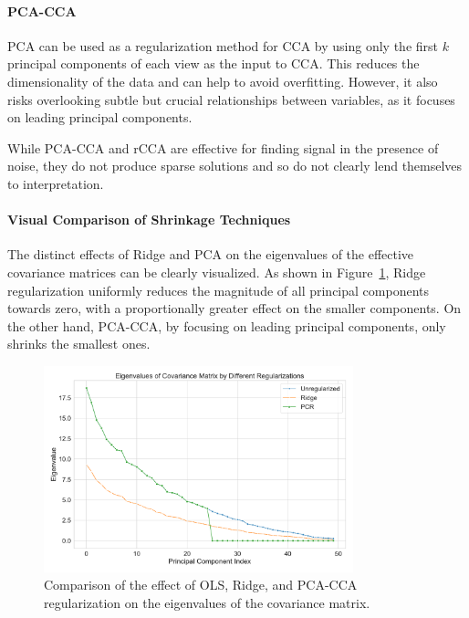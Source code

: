 \paragraph{PCA-CCA} PCA can be used as a regularization method for CCA by using only the first \( k \) principal components of each view as the input to CCA.
This reduces the dimensionality of the data and can help to avoid overfitting.
However, it also risks overlooking subtle but crucial relationships between variables, as it focuses on leading principal components.

While PCA-CCA and rCCA are effective for finding signal in the presence of noise, they do not produce sparse
solutions and so do not clearly lend themselves to interpretation.

\paragraph{Visual Comparison of Shrinkage Techniques}

The distinct effects of Ridge and PCA on the eigenvalues of the effective covariance matrices can be clearly visualized.
As shown in Figure~\ref{fig:shrinkage}, Ridge regularization uniformly reduces the magnitude of all principal components towards zero, with a proportionally greater effect on the smaller components.
On the other hand, PCA-CCA, by focusing on leading principal components, only shrinks the smallest ones.

\begin{figure}
    \centering
    \includegraphics[width=0.8\textwidth]{figures/shrinkage/shrinkage}
    \caption{Comparison of the effect of OLS, Ridge, and PCA-CCA regularization on the eigenvalues of the covariance matrix.}\label{fig:shrinkage}
\end{figure}

